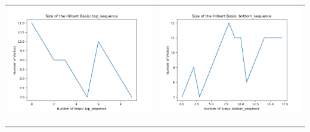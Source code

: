 \documentclass[10pt]{article}
\begin{document}
\begin{tabular}{c|c}
\begin{minipage}{.4\textwidth}
\includegraphics[width=\textwidth]{"DATA/4d/5 generators 2 bound C/top_sequence SIZE"}
\end{minipage} &
\begin{minipage}{.4\textwidth}
\includegraphics[width=\textwidth]{"DATA/4d/5 generators 2 bound C bottomup/bottom_sequence SIZE"}
\end{minipage} \\ \\
\hline \\\begin{minipage}{.4\textwidth}

\end{minipage}
\end{tabular}
\end{document}
